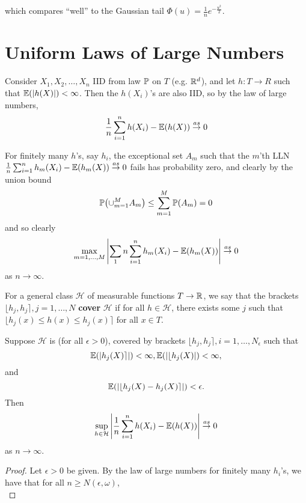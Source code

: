 which compares ``well'' to the Gaussian tail $\Phi(u) =
\frac{1}{n}e^{-\frac{u^{2}}{2}}$.


\section{Uniform Laws of Large Numbers}
\label{sec:uniform-laws-large}

Consider $X_{1}, X_{2}, \dots, X_{n}$ IID from law $\Prob$ on $T$
(e.g. $\mathbb{R}^{d}$), and let $h: T \rightarrow R$ such that $\E{|h(X)|} <
\infty$. Then the $h(X_{i})$'s are also IID, so by the law of large
numbers,
\begin{equation}
  \label{eq:23}
  \frac{1}{n} \sum_{i=1}^{n} h(X_{i}) - \E{h(X)} \cas 0
\end{equation}

For finitely many $h$'s, say $h_{i}$, the exceptional set $A_{m}$ such
that the $m$'th LLN $\frac{1}{n} \sum_{i=1}^{n} h_{m}(X_{i}) -
\E{h_{m}(X)} \cas 0$ fails has probability zero, and clearly by the
union bound
\begin{equation}
  \label{eq:24}
  \Prob{\cup_{m=1}^{M} A_{m}} \leq \sum_{m=1}^{M} \Prob{A_{m}} = 0
\end{equation} and so clearly
\begin{equation}
  \label{eq:25}
  \max_{m=1, \dots, M} \left| \sum_{1}{n} \sum_{i=1}^{n} h_{m}(X_{i})
    - \E{h_{m}(X)} \right| \cas 0
\end{equation} as $n \rightarrow \infty$.

For a general class $\mathcal{H}$ of measurable functions $T
\rightarrow \mathbb{R}$, we say that the brackets $\lfloor h_{j}, h_{j}
\rceil, j = 1, \dots, N$ \textbf{cover} $\mathcal{H}$ if for all $h
\in \mathcal{H}$, there exists some $j$ such that $\lfloor h_{j}(x)
\leq h(x) \leq h_{j}(x) \rceil$ for all $x \in T$.

\begin{proposition}
  \label{defn:ulln}
  Suppose $\mathcal{H}$ is (for all $\epsilon > 0$), covered by
  brackets $\lfloor h_{j}, h_{j} \rceil, i = 1, \dots, N_{\epsilon}$
  such that
  \begin{equation}
    \label{eq:26}
    \E{|h_{j}(X)\rceil|} < \infty, \E{|\lfloor h_{j}(X)|} < \infty,
  \end{equation} and
  \begin{equation}
    \label{eq:27}
    \E{|\lfloor h_{j}(X) - h_{j}(X)\rceil|} < \epsilon.
  \end{equation}  Then
  \begin{equation}
    \label{eq:28}
    \sup_{h \in \mathcal{H}} \left| \frac{1}{n} \sum_{i=1}^{n}
      h(X_{i}) - \E{h(X)} \right| \cas 0
  \end{equation} as $n \rightarrow \infty$.
\end{proposition}

\begin{proof}
  Let $\epsilon > 0$ be given. By the law of large numbers for
  finitely many $h_{i}$'s, we have that for all $n \geq N(\epsilon,
  \omega)$,
  \begin{equation}
    \label{eq:29}
  \end{equation}
\end{proof}

